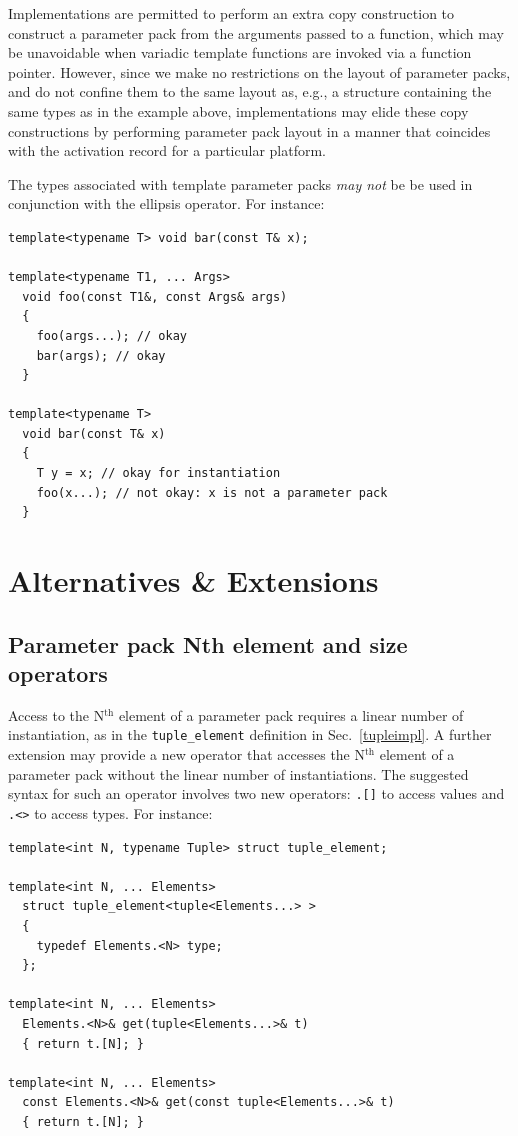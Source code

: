 \documentclass{article}
\begin{document}
Implementations are permitted to perform an extra copy construction to
construct a parameter pack from the arguments passed to a function,
which may be unavoidable when variadic template functions are invoked
via a function pointer. However, since we make no restrictions on the
layout of parameter packs, and do not confine them to the same layout
as, e.g., a structure containing the same types as in the example
above, implementations may elide these copy constructions by
performing parameter pack layout in a manner that coincides with the
activation record for a particular platform.

The types associated with template parameter packs \textit{may not} be
be used in conjunction with the ellipsis operator. For instance:

\begin{verbatim}
template<typename T> void bar(const T& x);

template<typename T1, ... Args>
  void foo(const T1&, const Args& args)
  { 
    foo(args...); // okay
    bar(args); // okay
  }

template<typename T> 
  void bar(const T& x)
  {
    T y = x; // okay for instantiation
    foo(x...); // not okay: x is not a parameter pack
  }
\end{verbatim}

\section{Alternatives \& Extensions}

\subsection{Parameter pack Nth element and size operators}
Access to the N$^\text{th}$ element of a parameter pack requires a
linear number of instantiation, as in the \texttt{tuple\_element}
definition in Sec.~\ref{tupleimpl}. A further extension may provide a
new operator that accesses the N$^\text{th}$ element of a parameter
pack without the linear number of instantiations. The suggested syntax
for such an operator involves two new operators: \texttt{.[]} to
access values and \texttt{.<>} to access types. For instance:

\begin{verbatim}
template<int N, typename Tuple> struct tuple_element;

template<int N, ... Elements>
  struct tuple_element<tuple<Elements...> >
  {
    typedef Elements.<N> type;
  };

template<int N, ... Elements>
  Elements.<N>& get(tuple<Elements...>& t)
  { return t.[N]; }

template<int N, ... Elements>
  const Elements.<N>& get(const tuple<Elements...>& t)
  { return t.[N]; }
\end{verbatim}
\end{document}
